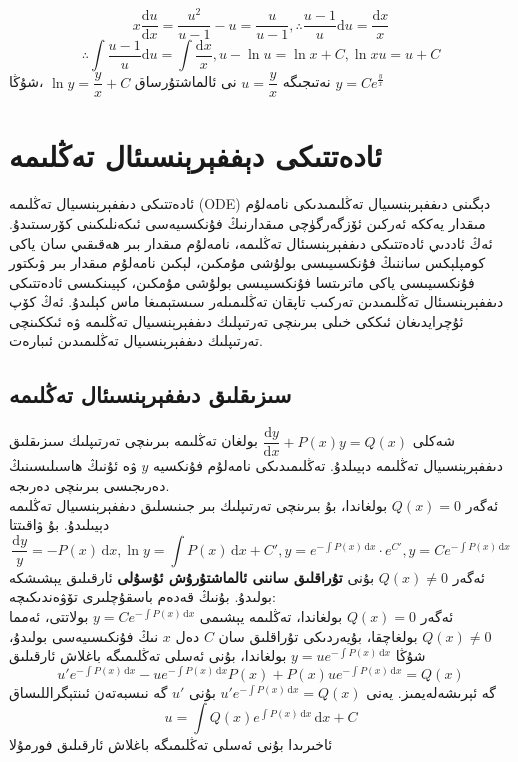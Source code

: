 \begin{itemize}
\begin{myexample}
	$$x\dfrac{\textrm{d}u}{\textrm{d}x}=\dfrac{u^2}{u-1}-u=\dfrac{u}{u-1},
	\therefore\dfrac{u-1}{u}\textrm{d}u=\dfrac{\textrm{d}x}{x}$$
	$$
	\therefore\displaystyle{\int\dfrac{u-1}{u}\textrm{d}u=\int\dfrac{\textrm{d}x}{x}}, u-\ln u=\ln x+C, \ln xu=u+C$$
	نەتىجىگە 
	$u=\dfrac{y}{x}$
	نى ئالماشتۇرساق
	$\ln y=\dfrac{y}{x}+C$
	،شۇڭا
	$y=Ce^{\frac{y}{x}}$
\end{myexample}

\end{itemize}


\section{ئادەتتىكى دېففېرېنسىئال تەڭلىمە}
ئادەتتىكى دىففېرېنسىيال تەڭلىمە (ODE) دېگىنى دىففېرېنسىيال تەڭلىمىدىكى نامەلۇم مىقدار يەككە ئەركىن ئۆزگەرگۈچى مىقدارنىڭ فۇنكسىيەسى ئىكەنلىكىنى كۆرسىتىدۇ. ئەڭ ئاددىي ئادەتتىكى دىففېرېنسىئال تەڭلىمە، نامەلۇم مىقدار بىر ھەقىقىي سان ياكى كومپلېكس ساننىڭ فۇنكسىيىسى بولۇشى مۇمكىن، لېكىن نامەلۇم مىقدار بىر ۋىكتور فۇنكسىيىسى ياكى ماترىتسا فۇنكسىيىسى بولۇشى مۇمكىن، كېيىنكىسى ئادەتتىكى دىففېرېنسىئال تەڭلىمىدىن تەركىب تاپقان تەڭلىمىلەر سىستېمىغا ماس كېلىدۇ. ئەڭ كۆپ ئۇچرايدىغان ئىككى خىلى بىرىنچى تەرتىپلىك دىففېرېنسىيال تەڭلىمە ۋە ئىككىنچى تەرتىپلىك دىففېرېنسىيال تەڭلىمىدىن ئىبارەت.
 
\subsection{سىزىقلىق دىففېرېنسىئال تەڭلىمە}
شەكلى 
$\dfrac{\textrm{d}y}{\textrm{d}x}+P(x)y=Q(x)$
بولغان تەڭلىمە بىرىنچى تەرتىپلىك سىزىقلىق دىففېرېنسىيال تەڭلىمە دېيىلدۇ. تەڭلىمىدىكى نامەلۇم فۇنكسيە $y$ ۋە ئۇنىڭ ھاسىلىسىنىڭ دەرىجىسى بىرىنچى دەرىجە.\\
ئەگەر $Q(x)=0$ بولغاندا، بۇ بىرىنچى تەرتىپلىك بىر جىنىسلىق دىففېرېنسىيال تەڭلىمە دېيىلىدۇ. بۇ ۋاقىتتا 
$$\dfrac{\textrm{d}y}{y}=-P(x)\,\textrm{d}x,\ln y=\int P(x)\,\textrm{d}x+C',y=e^{-\int P(x)\,\textrm{d}x}\cdot e^{C'},y=Ce^{-\int P(x)\,\textrm{d}x}$$
ئەگەر 
$Q(x)\neq 0$
بۇنى \textbf{تۇراقلىق ساننى ئالماشتۇرۇش ئۇسۇلى } ئارقىلىق يېشىشكە بولىدۇ. بۇنىڭ قەدەم باسقۇچلىرى تۆۋەندىكىچە:\\
ئەگەر 
$Q(x)=0$
بولغاندا، تەڭلىمە يېشىمى
$y=Ce^{-\int P(x)\,\textrm{d}x}$
بولاتتى، ئەمما $Q(x)\neq 0$
بولغاچقا، بۇيەردىكى تۇراقلىق سان $C$ دەل $x$ نىڭ فۇنكىسىيەسى بولىدۇ، شۇڭا 
$y=ue^{-\int P(x)\,\textrm{d}x}$
بولغاندا، بۇنى ئەسلى تەڭلىمىگە باغلاش ئارقىلىق
$$u'e^{-\int P(x)\,\textrm{d}x}-ue^{-\int P(x)\,\textrm{d}x}P(x)+P(x)ue^{-\int P(x)\,\textrm{d}x}=Q(x)$$
گە ئېرىشەلەيمىز. يەنى
$u'e^{-\int P(x)\,\textrm{d}x}=Q(x)$
بۇنى $u'$ گە نىسبەتەن ئىنتېگراللىساق
$$
u=\displaystyle{\int Q(x)e^{\int P(x)\,\textrm{d}x}\,\textrm{d}x}+C
$$
ئاخىرىدا بۇنى ئەسلى تەڭلىمىگە باغلاش ئارقىلىق فورمۇلا
\begin{center}
\end{center}


